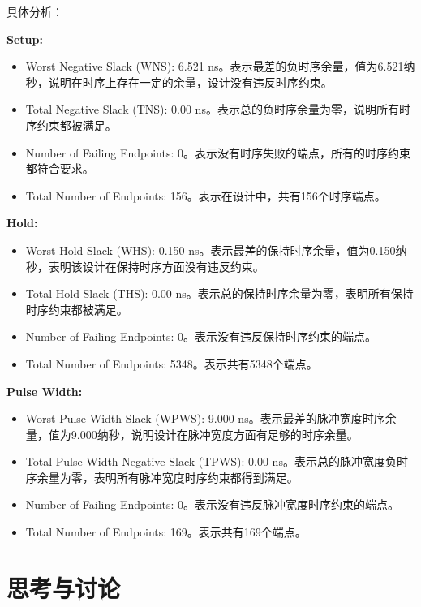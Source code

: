 具体分析：

\textbf{Setup:}  
\begin{itemize}
  \item Worst Negative Slack (WNS): 6.521 ns。表示最差的负时序余量，值为6.521纳秒，说明在时序上存在一定的余量，设计没有违反时序约束。  
\item Total Negative Slack (TNS): 0.00 ns。表示总的负时序余量为零，说明所有时序约束都被满足。  
\item Number of Failing Endpoints: 0。表示没有时序失败的端点，所有的时序约束都符合要求。  
\item Total Number of Endpoints: 156。表示在设计中，共有156个时序端点。
\end{itemize}


\textbf{Hold:}  
\begin{itemize}
\item Worst Hold Slack (WHS): 0.150 ns。表示最差的保持时序余量，值为0.150纳秒，表明该设计在保持时序方面没有违反约束。  
\item Total Hold Slack (THS): 0.00 ns。表示总的保持时序余量为零，表明所有保持时序约束都被满足。  
\item Number of Failing Endpoints: 0。表示没有违反保持时序约束的端点。  
\item Total Number of Endpoints: 5348。表示共有5348个端点。
\end{itemize}

\textbf{Pulse Width:}  
\begin{itemize}
  \item Worst Pulse Width Slack (WPWS): 9.000 ns。表示最差的脉冲宽度时序余量，值为9.000纳秒，说明设计在脉冲宽度方面有足够的时序余量。  
  \item Total Pulse Width Negative Slack (TPWS): 0.00 ns。表示总的脉冲宽度负时序余量为零，表明所有脉冲宽度时序约束都得到满足。  
  \item Number of Failing Endpoints: 0。表示没有违反脉冲宽度时序约束的端点。  
\item Total Number of Endpoints: 169。表示共有169个端点。
\end{itemize}

\section{思考与讨论}
